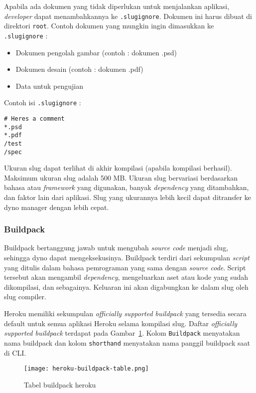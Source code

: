 Apabila ada dokumen yang tidak diperlukan untuk menjalankan aplikasi, \textit{developer} dapat menambahkannya ke \texttt{.slugignore}. Dokumen ini harus dibuat di direktori \texttt{root}. Contoh dokumen yang mungkin ingin dimasukkan ke \texttt{.slugignore} :
\begin{itemize}
\item Dokumen pengolah gambar (contoh : dokumen .psd)
\item Dokumen desain (contoh : dokumen .pdf)
\item Data untuk pengujian
\end{itemize}

Contoh isi \texttt{.slugignore} :
\begin{lstlisting}
# Heres a comment
*.psd
*.pdf
/test
/spec
\end{lstlisting}

Ukuran slug dapat terlihat di akhir kompilasi (apabila kompilasi berhasil). Maksimum ukuran slug adalah 500 MB. Ukuran slug bervariasi berdasarkan bahasa atau \textit{framework} yang digunakan, banyak \textit{dependency} yang ditambahkan, dan faktor lain dari aplikasi. Slug yang ukurannya lebih kecil dapat ditransfer ke dyno manager dengan lebih cepat.

\subsubsection{Buildpack}
Buildpack bertanggung jawab untuk mengubah \textit{source code} menjadi slug, sehingga dyno dapat mengeksekusinya. Buildpack terdiri dari sekumpulan \textit{script} yang ditulis dalam bahasa pemrograman yang sama dengan \textit{source code}. Script tersebut akan mengambil \textit{dependency}, mengeluarkan aset atau kode yang sudah dikompilasi, dan sebagainya. Keluaran ini akan digabungkan ke dalam slug oleh slug compiler.

Heroku memiliki sekumpulan \textit{officially supported buildpack} yang tersedia secara default untuk semua aplikasi Heroku selama kompilasi slug. Daftar \textit{officially supported buildpack} terdapat pada Gambar~\ref{fig:heroku-buildpack-table}. Kolom \texttt{Buildpack} menyatakan nama buildpack dan kolom \texttt{shorthand} menyatakan nama panggil buildpack saat di CLI.

\begin{figure}[H]
	\centering  
	\texttt{[image: heroku-buildpack-table.png]}  
	\caption[Tabel buildpack heroku]{Tabel buildpack heroku} 
	\label{fig:heroku-buildpack-table} 
\end{figure}

